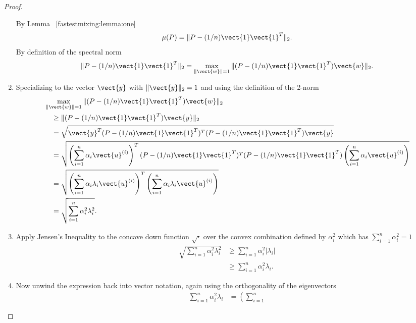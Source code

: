 \documentclass[12pt]{article}
\begin{document}
\begin{proof}
\begin{enumerate}
            By Lemma~%
            \ref{fastestmixing:lemma:one}
            \[
                \mu(P) = \| P - (1/n)\vect{1}\vect{1}^T \|_2.
            \] By definition of the spectral norm
            \[
                \| P - (1/n)\vect{1}\vect{1}^T \|_2 = \max_{\|\vect{w}
                \|=1} \| (P - (1/n)\vect{1}\vect{1}^T) \vect{w}\|_2.
            \]
        \item
            Specializing to the vector \( \vect{y} \) with \( \| \vect{y}
            \|_2 = 1 \) and using the definition of the 2-norm
            \begin{align*}
                & \max_{\|\vect{w} \|=1} \| (P - (1/n)\vect{1}\vect{1}^T)
                \vect{w}\|_2 \\
                &\quad \ge \| (P - (1/n)\vect{1}\vect{1}^T) \vect{y} \|_2
                \\
                &\quad = \sqrt{\vect{y}^T (P - (1/n)\vect{1}\vect{1}^T)^T
                (P - (1/n)\vect {1}\vect{1}^T) \vect{y} } \\
                &\quad = \sqrt{\left( \sum_{i=1}^n \alpha_i \vect{u}^{(i)}
                \right)^T (P - (1/n)\vect{1}\vect{1}^T)^T (P - (1/n)\vect
                {1}\vect {1}^T) \left( \sum_{i=1}^n \alpha_i \vect{u}^{(i)}
                \right)} \\
                &\quad = \sqrt{\left( \sum_{i=1}^n \alpha_i \lambda_i
                \vect{u}^ {(i)} \right)^T \left( \sum_{i=1}^n \alpha_i
                \lambda_i \vect{u}^ {(i)} \right)} \\
                &\quad = \sqrt{\sum_{i=1}^n \alpha_i^2 \lambda_i^2}.
            \end{align*}
        \item
            Apply Jensen's Inequality to the concave down function \(
            \sqrt{\cdot} \) over the convex combination defined by \(
            \alpha_i^2 \) which has \( \sum_{i=1}^n \alpha_i^2 = 1 \)
            \begin{align*}
                \sqrt{\sum_{i=1}^n \alpha_i^2 \lambda_i^2} &\ge \sum_{i=1}^n
                \alpha_i^2 | \lambda_i | \\
                &\ge \sum_{i=1}^n \alpha_i^2 \lambda_i.
            \end{align*}
        \item
            Now unwind the expression back into vector notation, again
            using the orthogonality of the eigenvectors
            \begin{align*}
                \sum_{i=1}^n \alpha_i^2 \lambda_i &= \left( \sum_{i=1}^n

\end{align*}
\end{enumerate}
\end{proof}
\end{document}
